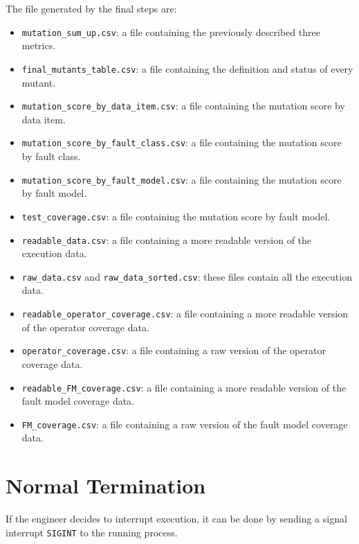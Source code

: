 The file generated by the final steps are:

\begin{itemize}
	\item \texttt{mutation\_sum\_up.csv}: a file containing the previously described three metrics.
	\item \texttt{final\_mutants\_table.csv}: a file containing the definition and status of every mutant.
	\item \texttt{mutation\_score\_by\_data\_item.csv}: a file containing the mutation score by data item.
	\item \texttt{mutation\_score\_by\_fault\_class.csv}: a file containing the mutation score by fault class.
	\item \texttt{mutation\_score\_by\_fault\_model.csv}: a file containing the mutation score by fault model.
	\item \texttt{test\_coverage.csv}: a file containing the mutation score by fault model.
	\item \texttt{readable\_data.csv}: a file containing a more readable version of the execution data.
	\item \texttt{raw\_data.csv} and \texttt{raw\_data\_sorted.csv}: these files contain all the execution data.
	\item \texttt{readable\_operator\_coverage.csv}: a file containing a more readable version of the operator coverage data.
	\item \texttt{operator\_coverage.csv}: a file containing a raw version of the operator coverage data.
	\item \texttt{readable\_FM\_coverage.csv}: a file containing a more readable version of the fault model coverage data.
	\item \texttt{FM\_coverage.csv}: a file containing a raw version of the fault model coverage data.
\end{itemize}

\section{Normal Termination}


If the engineer decides to interrupt \DAMA execution, it can be done by sending a signal interrupt \texttt{SIGINT} to the running process.

